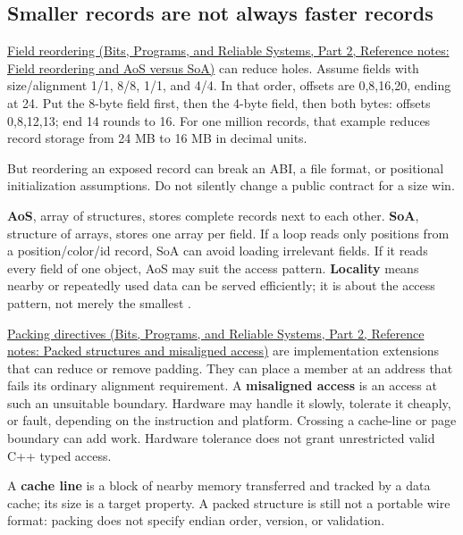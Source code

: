 \subsection{Smaller records are not always faster records}\label{05-engine-i-ch002-smaller-records-are-not-always-faster-records}

\hypertarget{05-engine-i-ch002-smaller-records-are-not-always-faster-records}{}

\href{../01-Bits-Programs-and-Reliable-Systems-P02/main.pdf\#nameddest=appendix-5522ad176ca0}{Field reordering (Bits, Programs, and Reliable Systems, Part 2, Reference notes: Field reordering and AoS versus SoA)} can reduce holes. Assume fields with size/alignment 1/1, 8/8, 1/1, and 4/4. In that order, offsets are 0,8,16,20, ending at 24. Put the 8-byte field first, then the 4-byte field, then both bytes: offsets 0,8,12,13; end 14 rounds to 16. For one million records, that example reduces record storage from 24 MB to 16 MB in decimal units.

But reordering an exposed record can break an ABI, a file format, or positional initialization assumptions. Do not silently change a public contract for a size win.

\textbf{AoS}, array of structures, stores complete records next to each other. \textbf{SoA}, structure of arrays, stores one array per field. If a loop reads only positions from a position/color/id record, SoA can avoid loading irrelevant fields. If it reads every field of one object, AoS may suit the access pattern. \textbf{Locality} means nearby or repeatedly used data can be served efficiently; it is about the access pattern, not merely the smallest .

\href{../01-Bits-Programs-and-Reliable-Systems-P02/main.pdf\#nameddest=appendix-0682dbfc5f0e}{Packing directives (Bits, Programs, and Reliable Systems, Part 2, Reference notes: Packed structures and misaligned access)} are implementation extensions that can reduce or remove padding. They can place a member at an address that fails its ordinary alignment requirement. A \textbf{misaligned access} is an access at such an unsuitable boundary. Hardware may handle it slowly, tolerate it cheaply, or fault, depending on the instruction and platform. Crossing a cache-line or page boundary can add work. Hardware tolerance does not grant unrestricted valid C++ typed access.

A \textbf{cache line} is a block of nearby memory transferred and tracked by a data cache; its size is a target property. A packed structure is still not a portable wire format: packing does not specify endian order, version, or validation.

